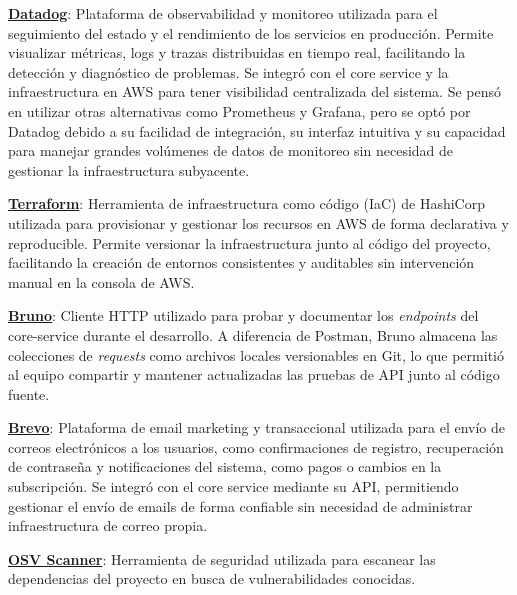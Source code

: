 \vspace{0.25cm}

\textbf{\underline{Datadog}}: Plataforma de observabilidad y monitoreo utilizada para el seguimiento del estado y el 
rendimiento de los servicios en producción. Permite visualizar métricas, logs y trazas distribuidas en tiempo real, facilitando 
la detección y diagnóstico de problemas. Se integró con el core service y la infraestructura en AWS para tener visibilidad 
centralizada del sistema. Se pensó en utilizar otras alternativas como Prometheus y Grafana, pero se optó por Datadog debido 
a su facilidad de integración, su interfaz intuitiva y su capacidad para manejar grandes volúmenes de datos de monitoreo 
sin necesidad de gestionar la infraestructura subyacente.

\vspace{0.25cm}

\textbf{\underline{Terraform}}: Herramienta de infraestructura como código (IaC) de HashiCorp utilizada para provisionar 
y gestionar los recursos en AWS de forma declarativa y reproducible. Permite versionar la infraestructura junto al código 
del proyecto, facilitando la creación de entornos consistentes y auditables sin intervención manual en la consola de AWS.

\vspace{0.25cm}

\textbf{\underline{Bruno}}: Cliente HTTP utilizado para probar y documentar los \textit{endpoints} del core-service durante 
el desarrollo. A diferencia de Postman, Bruno almacena las colecciones de \textit{requests} como archivos locales versionables 
en Git, lo que permitió al equipo compartir y mantener actualizadas las pruebas de API junto al código fuente.

\vspace{0.25cm}

\textbf{\underline{Brevo}}: Plataforma de email marketing y transaccional utilizada para el envío de correos electrónicos 
a los usuarios, como confirmaciones de registro, recuperación de contraseña y notificaciones del sistema, como pagos o cambios en 
la subscripción. Se integró con el core service mediante su API, permitiendo gestionar el envío de emails de forma confiable 
sin necesidad de administrar infraestructura de correo propia.

\vspace{0.25cm}

\textbf{\underline{OSV Scanner}}:
Herramienta de seguridad utilizada para escanear las dependencias del proyecto en busca de vulnerabilidades conocidas.

